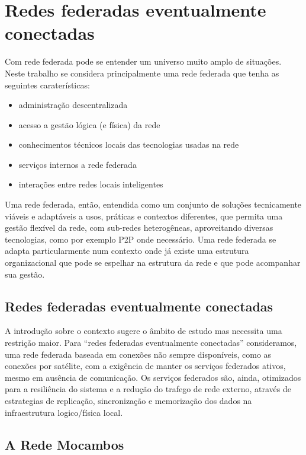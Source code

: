 
\chapter{Redes federadas eventualmente conectadas}
\label{Capitulo2}


Com rede federada pode se entender um universo muito amplo de
situações. Neste trabalho se considera principalmente uma rede
federada que tenha as seguintes caraterísticas:

\begin{itemize}
  \item administração descentralizada
  \item acesso a gestão lógica (e física) da rede
  \item conhecimentos técnicos locais das tecnologias usadas na rede
  \item serviços internos a rede federada
  \item interações entre redes locais inteligentes
\end{itemize} 

Uma rede federada, então, entendida como um conjunto de soluções
tecnicamente viáveis e adaptáveis a usos, práticas e contextos
diferentes, que permita uma gestão flexível da rede, com sub-redes
heterogêneas, aproveitando diversas tecnologias, como por exemplo P2P
onde necessário. Uma rede federada se adapta particularmente num
contexto onde já existe uma estrutura organizacional que pode se
espelhar na estrutura da rede e que pode acompanhar sua gestão. 

\section{Redes federadas eventualmente conectadas}
A introdução sobre o contexto sugere o âmbito de estudo mas necessita
uma restrição maior. Para ``redes federadas eventualmente conectadas''
consideramos, uma rede federada baseada em conexões não sempre
disponíveis, como as conexões por satélite, com a exigência de manter
os serviços federados ativos, mesmo em ausência de comunicação. Os
serviços federados são, ainda, otimizados para a resiliência do
sistema e a redução do trafego de rede externo, através de estrategias
de replicação, sincronização e memorização dos dados na infraestrutura
logico/física local.

\section{A Rede Mocambos}   
\label{sec:RedeMocambos}

